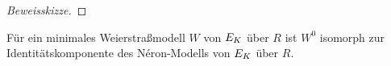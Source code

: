 \documentclass[german, bibliography=totoc]{scrreprt}
\begin{document}
\begin{Lemma}
\begin{proof}[Beweisskizze]
  \end{proof}
\end{Lemma}

\begin{Bemerkung}
  Für ein minimales Weierstraßmodell $W$ von $E_{K}$ über $R$
  ist $W^0$ isomorph zur Identitätskomponente des Néron-Modells von
  $E_{K}$ über $R$.
\end{Bemerkung}

\end{document}
